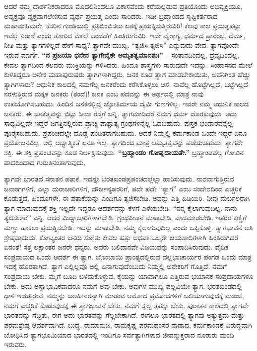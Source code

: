 ಆದರೆ ನಮ್ಮ ದಾರ್ಶನಿಕರಾದರೂ ಮೊದಲಿನಿಂದಲೂ ವಿಕಾಸವೆಂದು ಕರೆಯಲ್ಪಡುವ ಪ್ರತಿಯೊಂದು ಅಭಿವ್ಯಕ್ತಿಯೂ, ಅವ್ಯಕ್ತವೂ ವ್ಯಕ್ತವಾಗಲೆಣಿಸುವ ವ್ಯರ್ಥ ಪ್ರಯತ್ನ ಎಂದು ಸಾರಿದರು. ಇಡೀ ಬ್ರಹ್ಮಾಂಡದ ಸೃಷ್ಟಿಕರ್ತರಾದ ಮಹಾಮಹಿಮರೇ, ಕೆಸರಿನ ಗುಂಡಿಯಲ್ಲಿ ಪ್ರತಿಬಿಂಬಿಸಲು ಏತಕ್ಕೆ ಪ್ರಯತ್ನಿಸುತ್ತಿರುವಿರಿ! ಕೆಲವು ಕಾಲ ಪ್ರಯತ್ನಪಟ್ಟು ಇವೆಲ್ಲ ನಿರಾಶೆ ಎಂದು ತೋರಿದ ಮೇಲೆ ಬಂದೆಡೆಗೆ ಹಿಂತಿರುಗುವಿರಿ. ಇದೇ ವೈರಾಗ್ಯ, ಧರ್ಮದ ಪ್ರಾರಂಭ. ಧರ್ಮ, ನೀತಿ ಮತ್ತು ತ್ಯಾಗಗಳಿಲ್ಲದೆ ಹೇಗೆ ಸಾಧ್ಯ? ತ್ಯಾಗವೇ ಮುಖ್ಯ. “ತ್ಯಜಿಸಿ ತ್ಯಜಿಸಿ” ಎನ್ನುವುದು ವೇದ. ತ್ಯಾಗವೊಂದೇ ಇರುವ ಮಾರ್ಗ. \textbf{“ನ ಪ್ರಜಯಾ ಧನೇನ ತ್ಯಾಗೇನೈಕೇ ಅಮೃತತ್ವಮಾನಶುಃ”} – ಸಂತಾನದಿಂದಲ್ಲ, ದ್ರವ್ಯದಿಂದಲ್ಲ, ಕೇವಲ ತ್ಯಾಗದಿಂದ ಕೆಲವರು ಮುಕ್ತಿಯನ್ನು ಗಳಿಸಿದರು. ಹಿಂದೂ ಶಾಸ್ತ್ರಗಳು ಸಾರುವುದೇ ಇದನ್ನು. ಸಿಂಹಾಸನದ ಮೇಲೆ ಕುಳಿತಿದ್ದರೂ ಅನೇಕ ಮಹಾಪುರುಷರು ತ್ಯಾಗಿಗಳಾಗಿದ್ದರು. ಜನಕ ಕೂಡ ತ್ಯಾಗ ಮಾಡಬೇಕಾಯಿತು, ಅವನಿಗಿಂತ ಹೆಚ್ಚು ತ್ಯಾಗಿಗಳಾರು? ಆಧುನಿಕ ಕಾಲದಲ್ಲಿ ನಮಗೆಲ್ಲ ಜನಕರೆಂದು ಕರೆಸಿಕೊಳ್ಳಲು ಆಸೆ. ನಾವೆಲ್ಲ ಹೊಟ್ಟೆಗಿಲ್ಲದೆ, ಬಟ್ಟೆಗಿಲ್ಲದೆ ನರಳುತ್ತಿರುವ ಮಕ್ಕಳ ಜನಕರು (ತಂದೆ)! ಜನಕ ಎಂಬ ಪದವನ್ನು ಈ ಅರ್ಥದಲ್ಲಿ ಮಾತ್ರ ನಾವು ಉಪಯೋಗಿಸಬಹುದು. ಹಿಂದಿನ ಜನಕನಲ್ಲಿದ್ದ ಜ್ಯೋತಿರ್ಮಯ ದೈವೀ ಗುಣಗಳಿಲ್ಲ. ಇವರೇ ನಮ್ಮ ಆಧುನಿಕ ಕಾಲದ ಜನಕರು. ಈ ಜನಕತ್ವವನ್ನು ಬಿಟ್ಟು ಸೀದಾ ರಸ್ತೆಗೆ ಬನ್ನಿ. ತ್ಯಾಗಮಾಡಿದರೆ ನಿಮಗೆ ಧರ್ಮ ದೊರಕುವುದು. ಅದು ಸಾಧ್ಯವಿಲ್ಲದೇ ಇದ್ದರೆ ಜಗತ್ತಿನಲ್ಲಿರುವ ಪ್ರಾಚ್ಯ ಪಾಶ್ಚಾತ್ಯ ಗ್ರಂಥಗಳನ್ನೆಲ್ಲ ಓದಬಹುದು. ಪುಸ್ತಕ ಭಂಡಾರವನ್ನೆಲ್ಲ ಪೂರೈಸಬಹುದು. ಪ್ರಪಂಚದಲ್ಲೇ ದೊಡ್ಡ ಪಂಡಿತರಾಗಬಹುದು. ಆದರೆ ನಿಮ್ಮಲ್ಲಿ ಕರ್ಮಕಾಂಡ ಒಂದೇ ಇದ್ದರೆ ಏನೂ ಪ್ರಯೋಜನವಿಲ್ಲ. ಅಲ್ಲಿ ಆಧ್ಯಾತ್ಮಿಕತೆ ಏನೂ ಇಲ್ಲ. ತ್ಯಾಗದಿಂದ ಮಾತ್ರ ಆಮೃತತ್ವವನ್ನು ಪಡೆಯಬಹುದು. ತ್ಯಾಗವೇ ಶಕ್ತಿ. ಈ ಶಕ್ತಿ ಪ್ರಪಂಚವನ್ನು ಕೂಡ ನಿರ್ಲಕ್ಷಿಸುವುದು. \textbf{“ಬ್ರಹ್ಮಾಂಡಂ ಗೋಷ್ಪದಾಯತೇ.”} ಬ್ರಹ್ಮಾಂಡವೆಲ್ಲ ಗೋವಿನ ಪಾದದಿಂದಾದ ಗುರುತಿನಂತಾಗುವುದು.

ತ್ಯಾಗವೇ ಭಾರತದ ಸನಾತನ ಪತಾಕೆ. ಇದನ್ನೇ ಭರತಖಂಡಪ್ರಪಂಚದಲ್ಲೆಲ್ಲಾ ಹಾರಿಸುವುದು. ನಾಶವಾಗುತ್ತಿರುವ ಜನಾಂಗಗಳಿಗೆ, ಎಲ್ಲಾ ದುರಾಚಾರಿಗಳಿಗೆ, ದೌರ್ಜನ್ಯಪರರಿಗೆ, ಪದೇ ಪದೇ “ತ್ಯಾಗ” ಎಂಬ ಸಂದೇಶದಿಂದ ಎಚ್ಚರಿಕೆ ಕೊಡುತ್ತದೆ. ಹಿಂದೂಗಳೇ, ಈ ಪತಾಕೆಯನ್ನು ಎಂದಿಗೂ ತ್ಯಜಿಸಬೇಡಿ. ಅದನ್ನು ಎತ್ತಿ ಹಿಡಿಯಿರಿ. ನೀವು ದುರ್ಬಲರಾಗಿ ತ್ಯಾಗ ಮಾಡುವುದಕ್ಕೆ ಶಕ್ತಿ ಇಲ್ಲದೇ ಇದ್ದರೂ ಆದರ್ಶವನ್ನು ಕೆಳಗೆ ಎಳೆಯಬೇಡಿ. “ನನ್ನ ಕೈಲಾಗುವುದಿಲ್ಲ. ನಾನು ತ್ಯಜಿಸಲಾರೆ” ಎನ್ನಿ. ಆದರೆ ಮಿಥ್ಯಾಚಾರಿಗಳಾಗಬೇಡಿ. ಗ್ರಂಥಪೀಡನೆ ಮಾಡಬೇಡಿ, ವಾದಮಾಡಬೇಡಿ. ಇತರರ ಕಣ್ಣಿಗೆ ಮಣ್ಣು ಹಾಕಲು ಪ್ರಯತ್ನಿಸಬೇಡಿ. ಇದನ್ನು ಮಾಡಬೇಡಿ. ನಮ್ಮ ಕೈಲಾಗುವುದಿಲ್ಲ ಎಂದು ಒಪ್ಪಿಕೊಳ್ಳಿ. ತ್ಯಾಗಭಾವನೆ ಅತಿ ಶ್ರೇಷ್ಠವಾದುದು. ಕೋಟ್ಯಂತರ ಜನರು ಸೋತು ಕೇವಲ ಹತ್ತು ಅಥವಾ ಒಬ್ಬರೇ ಜಯಶಾಲಿಗಳಾಗಿ ಹಿಂತಿರುಗಿದರೆ ಏನಂತೆ! ಸತ್ತ ಲಕ್ಷಾಂತರ ಜನರೇ ಧನ್ಯರು. ಅವರು ಬಲಿದಾನವೇ ವಿಜಯವನ್ನು ಸಂಪಾದಿಸಿರುವುದು. ವೈದಿಕ ಸಂಪ್ರದಾಯದ ಒಂದು ಆದರ್ಶ ಈ ತ್ಯಾಗ. ಬೊಂಬಾಯಿ ಪ್ರಾಂತ್ಯದಲ್ಲಿರುವ ವಲ್ಲಭಾಚಾರ್ಯರ ಪಂಗಡ ಒಂದು ಮಾತ್ರ ಇದಕ್ಕೆ ಹೊರತಾಗಿದೆ. ತ್ಯಾಗ ಎಲ್ಲಿಲ್ಲವೊ ಅಲ್ಲಿ ಏನಾಗುವುದೆಂಬುದು ನಿಮ್ಮಲ್ಲಿ ಅನೇಕರಿಗೆ ಗೊತ್ತಿದೆ. ನಮಗೆ ಸಂಪ್ರದಾಯ ಬೇಕು. ಮೈಗೆ ಬೂದಿ ಬಳಿದುಕೊಳ್ಳುವ, ಕೈಯನ್ನು ಯಾವಾಗಲೂ ಎತ್ತಿರುವ ಭಯಾನಕ ಸಂಪ್ರದಾಯಗಳೂ ಬೇಕು. ಅದು ಅಸ್ವಾಭಾವಿಕವಾದರೂ ನಮಗೆ ಅವು ಬೇಕು. ಅವುಗಳ ಮುಖ್ಯ ಪಲ್ಲವಿಯೇ ತ್ಯಾಗ. ಭರತಖಂಡದಲ್ಲಿ ಧಾಳಿ ಇಡುತ್ತಿರುವ, ನಮ್ಮನ್ನು ಬಲಹೀನರನ್ನಾಗಿ ಮಾಡುವ ಆಮೋದ ಪ್ರಮೋದಗಳಿಗೆ ಬಲಿಯಾಗುವುದಕ್ಕೆ ಮುಂಚೆ, ನಮಗೆ ಎಚ್ಚರಿಕೆ ಕೊಡುವುದಕ್ಕೆ ಈ ತ್ಯಾಗಭಾವನೆ ಬೇಕು. ನಮಗೆ ಸ್ವಲ್ಪ ತಪಸ್ಸು ಬೇಕು. ಪುರಾತನ ಕಾಲದಲ್ಲಿ ತ್ಯಾಗವೇ ಭಾರತವನ್ನು ಗೆದ್ದಿತು, ಈಗ ಅದು ಭಾರತವನ್ನು ಗೆಲ್ಲಬೇಕಾಗಿದೆ. ಈಗಲೂ ಭಾರತದಲ್ಲಿ ತ್ಯಾಗವು ಅತ್ಯುತ್ತಮ ಮತ್ತು ಪರಮಶ್ರೇಷ್ಠ ಆದರ್ಶವಾಗಿದೆ. ಬುದ್ಧ, ರಾಮಾನುಜ, ರಾಮಕೃಷ್ಣ ಪರಮಹಂಸರ ನಾಡಾದ, ಕರ್ಮಕಾಂಡಕ್ಕೆ ವಿರುದ್ಧವಾಗಿ ಬೋಧಿಸಿದ ತ್ಯಾಗಭೂಮಿಯಾದ ಭಾರತದಲ್ಲಿ ಇಂದಿಗೂ ಸರ್ವತ್ಯಾಗಿಗಳಾದ ಜೀವನ್ಮುಕ್ತರಾದ ನೂರಾರು ಮಂದಿ ಇರುವರು.


